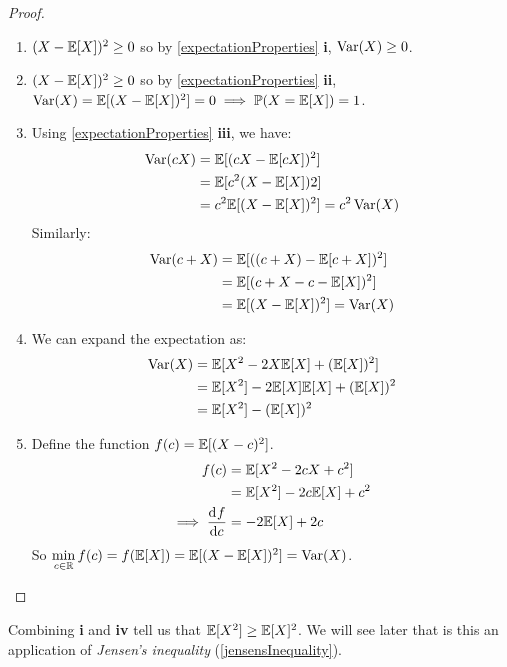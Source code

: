 \documentclass[../main.tex]{subfiles}
\begin{document}
\begin{proof}
\begin{enumerate}
  \item $(X - \mathbb{E}[X])^2 \geq 0$ so by \cref{expectationProperties} \textbf{i}, $\operatorname{Var}(X) \geq 0$.
  \item $(X - \mathbb{E}[X])^2 \geq 0$ so by \cref{expectationProperties} \textbf{ii}, $\operatorname{Var}(X) = \mathbb{E}[(X - \mathbb{E}[X])^2] = 0 \implies \mathbb{P}(X = \mathbb{E}[X]) = 1$.
  \item
    Using \cref{expectationProperties} \textbf{iii}, we have:
    \begin{align*}
      \operatorname{Var}(cX) &= \mathbb{E}[(cX - \mathbb{E}[cX])^2] \\
               &= \mathbb{E}[c^2(X - \mathbb{E}[X])2] \\
               &= c^2 \mathbb{E}[(X - \mathbb{E}[X])^2] = c^2 \operatorname{Var}(X)
    \end{align*}
    Similarly:
    \begin{align*}
      \operatorname{Var}(c + X) &= \mathbb{E}[((c + X) - \mathbb{E}[c + X])^2] \\
                  &= \mathbb{E}[(c + X - c - \mathbb{E}[X])^2] \\
                  &= \mathbb{E}[(X - \mathbb{E}[X])^2] = \operatorname{Var}(X)
    \end{align*}
  \item We can expand the expectation as:
    \begin{align*}
      \operatorname{Var}(X) &= \mathbb{E}[X^2 - 2X\mathbb{E}[X] + (\mathbb{E}[X])^2] \\
              &= \mathbb{E}[X^2] - 2\mathbb{E}[X]\mathbb{E}[X] + (\mathbb{E}[X])^2 \\
              &= \mathbb{E}[X^2] - (\mathbb{E}[X])^2
    \end{align*}
  \item Define the function $f(c) = \mathbb{E}[(X - c)^2]$.
    \begin{align*}
      f(c) &= \E[X^2 - 2cX + c^2] \\
           &= \E[X^2] - 2c\E[X] + c^2 \\
      \implies \deriv{f}{c} &= -2\E[X] + 2c
    \end{align*}
    So $\min\limits_{c \in \mathbb{R}}f(c) = f(\mathbb{E}[X]) = \mathbb{E}[(X - \mathbb{E}[X])^2] = \operatorname{Var}(X)$.
\end{enumerate}
\end{proof}
\begin{remark}
  Combining \textbf{i} and \textbf{iv} tell us that $\mathbb{E}[X^2] \geq \mathbb{E}[X]^2$.
  We will see later that is this an application of \textit{Jensen's inequality} (\cref{jensensInequality}).
\end{remark}
\end{document}
